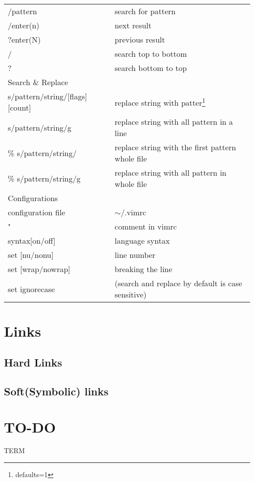 \documentclass{article}
\begin{document}
\begin{longtable}{ll}
			/pattern                                    & search for pattern                                \\
			/enter(n)                                   & next result                                       \\
			?enter(N)                                   & previous result                                   \\
			/                                           & search top to bottom                              \\
			?                                           & search bottom to top                              \\ \hline
			Search \& Replace                           &                                                   \\ \hline
			[range]s/{pattern}/{string}/[flags] [count] & replace string with patter\footnote{defaults=1}   \\
			s/{pattern}/{string}/g                      & replace string with all pattern in a line         \\
			\% s/{pattern}/{string}/                    & replace string with the first pattern whole file  \\
			\% s/{pattern}/{string}/g                   & replace string with all pattern in whole file     \\ \hline
			Configurations                              &                                                   \\ \hline
			configuration file                          & \(\sim \)/.vimrc                                  \\
			"                                           & comment in vimrc                                  \\
			syntax[on/off]                              & language syntax                                   \\
			set [nu/nonu]                               & line number                                       \\
			set [wrap/nowrap]                           & breaking the line                                 \\
			set ignorecase                              & (search and replace by default is case sensitive)
		\end{longtable}				
	\section{Links}
		\subsection{Hard Links}
		\subsection{Soft(Symbolic) links}

	\section{TO-DO}
		TERM \\
		
\end{document}
